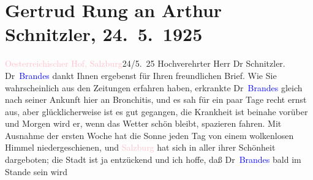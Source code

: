 

               \section[Gertrud Rung an Arthur Schnitzler, 24. 5. 1925]{ Gertrud Rung an Arthur Schnitzler, 24. 5. 1925}\nopagebreak{}\rehead{ }\normalsize\beginnumbering{} \toendnotes[C]{\smallbreak\pagebreak[2]} 
\pstart
           \raggedleft{}{\pb}\textcolor{pink}{Oesterreichischer Hof, Salzburg}{}\ledrightnote{\textcolor{pink}{Österreichischer Hof}}{\\}24/5. 25\pend
           \pstart{}Hochverehrter Herr Dr Schnitzler.\pend\pstart
           Dr \textcolor{blue}{Brandes}{}\ledrightnote{\textcolor{blue}{Georg Brandes}} dankt Ihnen ergebenst für Ihren
                    freundlichen Brief. Wie Sie wahrscheinlich aus den Zeitungen erfahren haben,
                    erkrankte Dr \textcolor{blue}{Brandes}{}\ledrightnote{\textcolor{blue}{Georg Brandes}} gleich nach seiner
                    Ankunft hier an Bronchitis, und es sah für ein paar Tage recht ernst aus, aber
                    glücklicherweise ist es gut gegangen, die Krankheit ist beinahe vorüber und
                    Morgen {\pb}wird er, wenn das
                    Wetter schön bleibt, spazieren fahren.\pend
           \pstart
           Mit Ausnahme der ersten Woche hat die Sonne jeden Tag von einem wolkenlosen
                    Himmel niedergeschienen, und \textcolor{pink}{Salzburg}{}\ledrightnote{\textcolor{pink}{Salzburg}} hat sich
                    in aller ihrer Schönheit dargeboten; die Stadt ist ja entzückend und ich hoffe,
                    daß Dr \textcolor{blue}{Brandes}{}\ledrightnote{\textcolor{blue}{Georg Brandes}} bald im Stande sein wird
